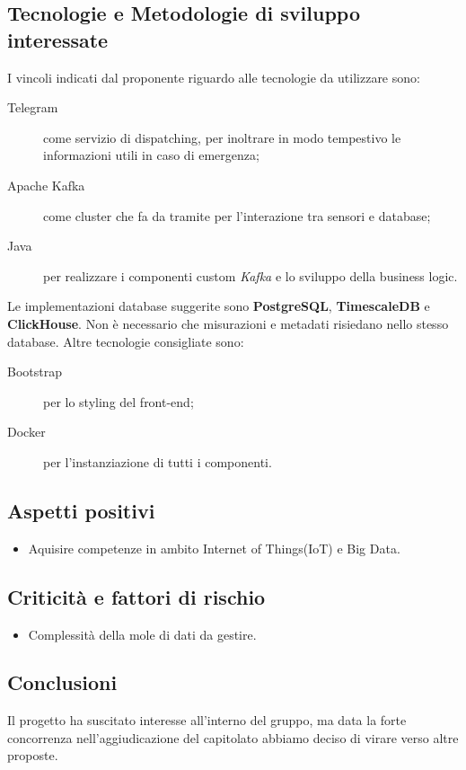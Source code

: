 \documentclass[../studio-di-fattibilita.tex]{subfiles}
\begin{document}
  \subsection{Tecnologie e Metodologie di sviluppo interessate}%
  \label{subsec:tecnologie_interessate}
  I vincoli indicati dal proponente riguardo alle tecnologie da utilizzare sono:
  \begin{description}
    \item[Telegram] come servizio di dispatching, per inoltrare in modo tempestivo le informazioni utili in caso di emergenza;
    \item[Apache Kafka] come cluster che fa da tramite per l'interazione tra sensori e database;
    \item[Java] per realizzare i componenti custom \textit{Kafka} e lo sviluppo della business logic.
  \end{description}
  Le implementazioni database suggerite sono \textbf{PostgreSQL}, \textbf{TimescaleDB} e \textbf{ClickHouse}.
  Non è necessario che misurazioni e metadati risiedano nello stesso database.
  Altre tecnologie consigliate sono:
  \begin{description}
    \item[Bootstrap] per lo styling del front-end;
    \item[Docker] per l'instanziazione di tutti i componenti.
  \end{description}


  \subsection{Aspetti positivi}%
  \label{subsec:aspetti_positivi}
  \begin{itemize}
    \item Aquisire competenze in ambito Internet of Things(IoT) e Big Data.
  \end{itemize}


  \subsection{Criticità e fattori di rischio}%
  \label{subsec:criticita_e_fattori_di_rischio}
  \begin{itemize}
    \item Complessità della mole di dati da gestire.
  \end{itemize}


  \subsection{Conclusioni}%
  \label{subsec:conclusioni}
  Il progetto ha suscitato interesse all'interno del gruppo, ma data la forte concorrenza nell'aggiudicazione del capitolato abbiamo deciso di virare verso altre proposte.
\end{document}
